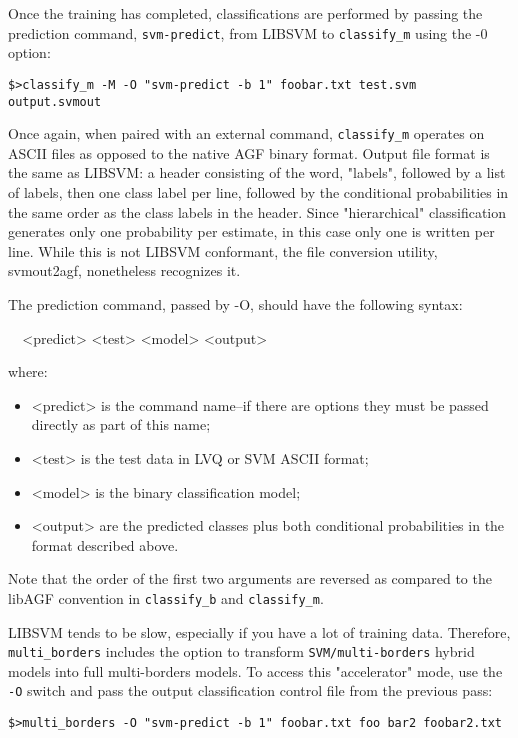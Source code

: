 \documentclass[12pt]{article}
\begin{document}
Once the training has completed, classifications are performed by passing the prediction command, \verb"svm-predict", from LIBSVM to \verb"classify_m" using the -0 option:

\begin{verbatim}
$>classify_m -M -O "svm-predict -b 1" foobar.txt test.svm output.svmout
\end{verbatim}

Once again, when paired with an external command, \verb/classify_m/ operates on ASCII files as opposed to the native AGF binary format. Output file format is the same as LIBSVM: a header consisting of the word, "labels", followed by a list of labels, then one class label per line, followed by the conditional probabilities in the same order as the class labels in the header. Since "hierarchical" classification generates only one probability per estimate, in this case only one is written per line.  While this is not LIBSVM conformant, the file conversion utility, svmout2agf, nonetheless recognizes it.  

The prediction command, passed by -O, should have the following syntax:

\verb/  /<predict> <test> <model> <output>

where:
\begin{itemize}
\item <predict> is the command name--if there are options they must be passed directly as part of this name;
\item <test> is the test data in LVQ or SVM ASCII format;
\item <model> is the binary classification model;
\item <output> are the predicted classes plus both conditional probabilities in the format described above.
\end{itemize}
Note that the order of the first two arguments are reversed as compared to the libAGF convention in \verb/classify_b/ and \verb/classify_m/.

LIBSVM tends to be slow, especially if you have a lot of training data.  Therefore, \verb/multi_borders/ includes the option to transform \verb"SVM/multi-borders" hybrid models into full multi-borders models.  To access this "accelerator" mode, use the \verb/-O/ switch and pass the output classification control file from the previous pass:

\begin{verbatim}
$>multi_borders -O "svm-predict -b 1" foobar.txt foo bar2 foobar2.txt
\end{verbatim}
\end{document}
